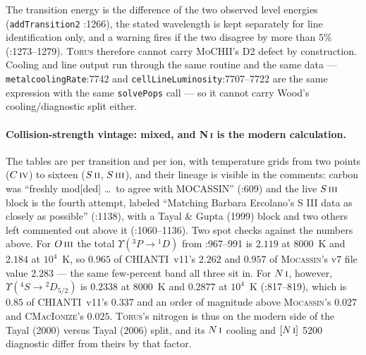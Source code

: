 \documentclass[english,a4paper]{my_memo}
\newcommand{\code}[1]{\texttt{#1}}
\newcommand{\MoCHII}{\textsc{MoCHII}}
\newcommand{\Mocassin}{\textsc{Mocassin}}
\newcommand{\CMI}{\textsc{CMacIonize}}
\newcommand{\Torus}{\textsc{Torus}}
\newcommand{\OIII}{O\,\textsc{iii}}
\newcommand{\NI}{N\,\textsc{i}}
\newcommand{\CIV}{C\,\textsc{iv}}
\newcommand{\SII}{S\,\textsc{ii}}
\newcommand{\SIII}{S\,\textsc{iii}}
\begin{document}
The transition energy is the difference of the two observed level energies
(\code{addTransition2} :1266), the stated wavelength is kept separately for
line identification only, and a warning fires if the two disagree by more than
$5\%$ (:1273--1279).  \Torus{} therefore cannot carry \MoCHII{}'s D2 defect by
construction.  Cooling and line output run through the same routine and the
same data --- \code{metalcoolingRate}:7742 and
\code{cellLineLuminosity}:7707--7722 are the same expression with the same
\code{solvePops} call --- so it cannot carry Wood's cooling/diagnostic split
either.

\paragraph{Collision-strength vintage: mixed, and \NI{} is the modern
calculation.}  The tables are per transition and per ion, with temperature
grids from two points ($\CIV{}$) to sixteen ($\SII{}$, $\SIII{}$), and their
lineage is visible in the comments: carbon was ``freshly mod[ded] \dots\ to
agree with MOCASSIN'' (:609) and the live $\SIII{}$ block is the fourth
attempt, labeled ``Matching Barbara Ercolano's S III data as closely as
possible'' (:1138), with a Tayal \& Gupta (1999) block and two others left
commented out above it (:1060--1136).  Two spot checks against the numbers
above.  For $\OIII{}$ the total $\Upsilon(^3P \to {}^1D)$ from :967--991 is
$2.119$ at 8000~K and $2.184$ at $10^4$~K, so $0.965$ of CHIANTI~v11's $2.262$
and $0.957$ of \Mocassin{}'s v7 file value $2.283$ --- the same few-percent
band all three sit in.  For $\NI{}$, however,
$\Upsilon(^4S \to {}^2D_{5/2})$ is $0.2338$ at 8000~K and $0.2877$ at $10^4$~K
(:817--819), which is $0.85$ of CHIANTI~v11's $0.337$ and an order of magnitude
above \Mocassin{}'s $0.027$ and \CMI{}'s $0.025$.  \Torus{}'s nitrogen is thus
on the modern side of the Tayal (2000) versus Tayal (2006) split, and its
$\NI{}$ cooling and $[\NI{}]$ 5200 diagnostic differ from theirs by that
factor.
\end{document}
